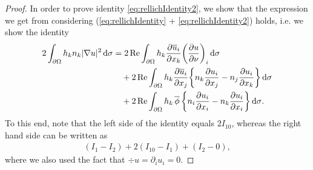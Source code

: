 \begin{proof}
  In order to prove identity \eqref{eq:rellichIdentity2}, we show that the expression we get from considering (\eqref{eq:rellichIdentity} + \eqref{eq:rellichIdentity2}) holds, i.e. we show the identity
  \begin{align*}
    2 \int_{\partial\Omega} h_k n_k |\nabla u|^2 \, {\operatorname{d}\!{\sigma}}
    &= 2 \operatorname{Re} \int_{\partial\Omega} h_k \frac{\partial \overline u_i}{\partial x_k} \bigg( \frac{\partial u}{\partial \nu} \bigg)_i \, {\operatorname{d}\!{\sigma}} \\
    &\quad + 2 \operatorname{Re} \int_{\partial\Omega} h_k \frac{\partial\overline u_i}{\partial x_j} \bigg\{ n_k \frac{\partial u_i}{\partial x_j} - n_j \frac{\partial u_i}{\partial x_k} \bigg\} \, {\operatorname{d}\!{\sigma}} \\
    &\quad+ 2 \operatorname{Re} \int_{\partial\Omega} h_k \, \overline \phi\,  \bigg\{ n_i \frac{\partial u_i}{\partial x_i} - n_k \frac{\partial u_i}{\partial x_i} \bigg\} \, {\operatorname{d}\!{\sigma}}.
  \end{align*}
  To this end, note that the left side of the identity equals $2 I_{10}$, whereas the right hand side can be written as 
  \begin{align*}
    (I_1 - I_2) + 2 (I_{10} - I_1) + (I_2 - 0),
  \end{align*}
  where we also used the fact that $\div u = \partial_i u_i = 0$.
\end{proof}

